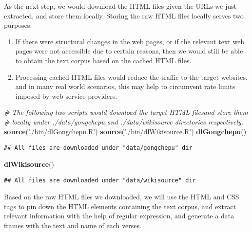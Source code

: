 \documentclass[]{article}
\newenvironment{Shaded}{\begin{snugshade}}{\end{snugshade}}
\newcommand{\CommentTok}[1]{\textcolor[rgb]{0.56,0.35,0.01}{\textit{#1}}}
\newcommand{\KeywordTok}[1]{\textcolor[rgb]{0.13,0.29,0.53}{\textbf{#1}}}
\newcommand{\NormalTok}[1]{#1}
\newcommand{\StringTok}[1]{\textcolor[rgb]{0.31,0.60,0.02}{#1}}
\providecommand{\tightlist}{%
  \setlength{\itemsep}{0pt}\setlength{\parskip}{0pt}}
\begin{document}
As the next step, we would download the HTML files given the URLs we
just extracted, and store them locally. Storing the raw HTML files
locally serves two purposes:

\begin{enumerate}
\def\labelenumi{\arabic{enumi}.}
\tightlist
\item
  If there were structural changes in the web pages, or if the relevant
  text web pages were not accessible due to certain reasons, then we
  would still be able to obtain the text corpus based on the cached HTML
  files.
\item
  Processing cached HTML files would reduce the traffic to the target
  websites, and in many real world scenarios, this may help to
  circumvent rate limits imposed by web service providers.
\end{enumerate}

\begin{Shaded}
\begin{Highlighting}[]
\CommentTok{# The following two scripts would download the target HTML filesand store them}
\CommentTok{# locally under ./data/gongchepu and ./data/wikisource directories respectively.}
\KeywordTok{source}\NormalTok{(}\StringTok{'./bin/dlGongchepu.R'}\NormalTok{)}
\KeywordTok{source}\NormalTok{(}\StringTok{'./bin/dlWikisource.R'}\NormalTok{)}
\KeywordTok{dlGongchepu}\NormalTok{()}
\end{Highlighting}
\end{Shaded}

\begin{verbatim}
## All files are downloaded under "data/gongchepu" dir
\end{verbatim}

\begin{Shaded}
\begin{Highlighting}[]
\KeywordTok{dlWikisource}\NormalTok{()}
\end{Highlighting}
\end{Shaded}

\begin{verbatim}
## All files are downloaded under "data/wikisource" dir
\end{verbatim}

Based on the raw HTML files we downloaded, we will use the HTML and CSS
tags to pin down the HTML elements containing the text corpus, and
extract relevant information with the help of regular expression, and
generate a data frames with the text and name of each verses.
\end{document}
